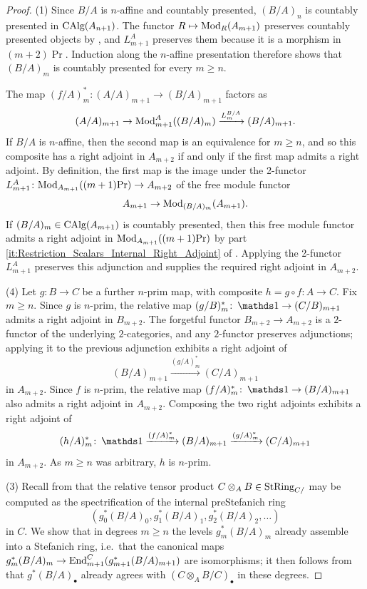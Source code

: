 \documentclass[11pt]{book}
\begin{document}
	\begin{proof}
		(1) Since $B/A$ is $n$-affine and countably presented, $(B/A)_n$ is countably presented in ${\textup{CAlg}}(A_{n+1})$. The functor $R \mapsto {\textup{Mod}}_R(A_{m+1})$ preserves countably presented objects by , and $L^A_{m+1}$ preserves them because it is a morphism in $(m+2)\Pr$. Induction along the $n$-affine presentation therefore shows that $(B/A)_m$ is countably presented for every $m \geq n$.

		The map $(f/A)^*_m\colon (A/A)_{m+1} \to (B/A)_{m+1}$ factors as
		\[
			(A/A)_{m+1} \to {\textup{Mod}}^A_{m+1}((B/A)_m) \xrightarrow{L^{B/A}_m} (B/A)_{m+1}.
		\]
		If $B/A$ is $n$-affine, then the second map is an equivalence for $m \geq n$, and so this composite has a right adjoint in $A_{m+2}$ if and only if the first map admits a right adjoint. By definition, the first map is the image under the 2-functor $L^A_{m+1}\colon {\textup{Mod}}_{A_{m+1}}((m+1)\textup{Pr}) \to A_{m+2}$ of the free module functor
		\[
			A_{m+1} \to {\textup{Mod}}_{(B/A)_m}(A_{m+1}).
		\]
		If $(B/A)_m \in {\textup{CAlg}}(A_{m+1})$ is countably presented, then this free module functor admits a right adjoint in ${\textup{Mod}}_{A_{m+1}}((m+1)\textup{Pr})$ by part \eqref{it:Restriction_Scalars_Internal_Right_Adjoint} of . Applying the 2-functor $L^A_{m+1}$ preserves this adjunction and supplies the required right adjoint in $A_{m+2}$.
		
		(4) Let $g\colon B \to C$ be a further $n$-prim map, with composite $h = g \circ f\colon A \to C$. Fix $m \geq n$. Since $g$ is $n$-prim, the relative map $(g/B)^*_m\colon \unit \to (C/B)_{m+1}$ admits a right adjoint in $B_{m+2}$. The forgetful functor $B_{m+2} \to A_{m+2}$ is a $2$-functor of the underlying $2$-categories, and any $2$-functor preserves adjunctions; applying it to the previous adjunction exhibits a right adjoint of
		\[
			(B/A)_{m+1} \xrightarrow{(g/A)^*_m} (C/A)_{m+1}
		\]
		in $A_{m+2}$. Since $f$ is $n$-prim, the relative map $(f/A)^*_m\colon \unit \to (B/A)_{m+1}$ also admits a right adjoint in $A_{m+2}$. Composing the two right adjoints exhibits a right adjoint of
		\[
			(h/A)^*_m\colon \unit \xrightarrow{(f/A)^*_m} (B/A)_{m+1} \xrightarrow{(g/A)^*_m} (C/A)_{m+1}
		\]
		in $A_{m+2}$. As $m \geq n$ was arbitrary, $h$ is $n$-prim.

		(3) Recall from  that the relative tensor product $C \otimes_A B \in {\textup{StRing}}_{C/}$ may be computed as the spectrification of the internal preStefanich ring
		\[
			(g_0^*(B/A)_0, g_1^*(B/A)_1, g_2^*(B/A)_2, \dots)
		\]
		in $C$. We show that in degrees $m \geq n$ the levels $g^*_m(B/A)_m$ already assemble into a Stefanich ring, i.e.\ that the canonical maps $g^*_m(B/A)_m \to \operatorname{End}^C_{m+1}(g^*_{m+1}(B/A)_{m+1})$ are isomorphisms; it then follows from  that $g^*(B/A)_\bullet$ already agrees with $(C \otimes_A B / C)_\bullet$ in these degrees.


\end{proof}
\end{document}
